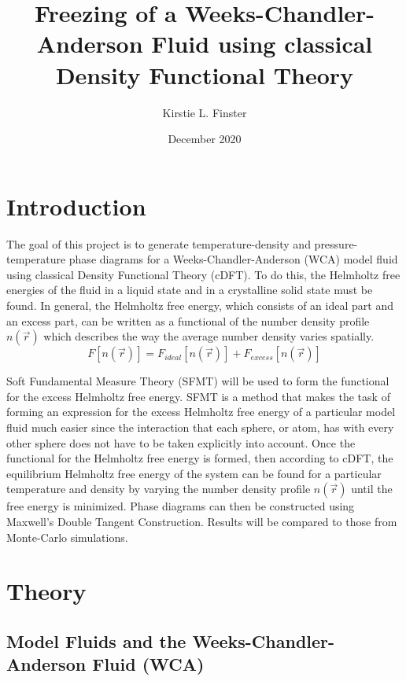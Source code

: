 \documentclass[double,12pt]{beavtex}
\title{Freezing of a Weeks-Chandler-Anderson Fluid using classical Density Functional Theory}
\author{Kirstie L. Finster}
\date{December 2020}
\begin{document}
   \maketitle
   \mainmatter

\chapter{Introduction}

The goal of this project is to generate temperature-density 
and pressure-temperature phase diagrams for a Weeks-Chandler-Anderson 
(WCA) model fluid using classical Density Functional Theory (cDFT). 
To do this, the Helmholtz free energies of the fluid
in a liquid state and in a crystalline solid state must be found.
In general, the Helmholtz free energy, which consists of an ideal part 
and an excess part, can be written as a functional of the number density 
profile $n(\vec{r})$ which describes the way the average number 
density varies spatially. 
\begin{equation}{F[n(\vec{r})]=F_{ideal}[n(\vec{r})] + F_{excess}[n(\vec{r})]}\end{equation} 

Soft Fundamental Measure Theory (SFMT) will be used to form the 
functional for the excess Helmholtz free energy. 
SFMT is a method that makes the task of 
forming an expression for the excess Helmholtz free energy of a particular 
model fluid much easier since the interaction that each sphere, or atom, 
has with every other sphere does not have to be taken explicitly into account.
Once the functional for the Helmholtz free energy is formed, then 
according to cDFT, the equilibrium
Helmholtz free energy of the system can be found for a particular 
temperature and density by varying the number 
density profile $n(\vec{r})$ until the free energy is minimized. 
Phase diagrams can then be constructed using Maxwell's Double Tangent Construction. 
Results will be compared to those from Monte-Carlo simulations.

\chapter{Theory}

\section{Model Fluids and the Weeks-Chandler-Anderson Fluid (WCA)}
\end{document}
